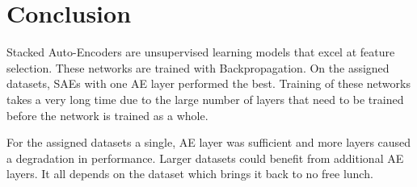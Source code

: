 \documentclass[twoside,11pt]{article}
\begin{document}
\section{Conclusion}
	Stacked Auto-Encoders are unsupervised learning models that excel at feature selection. These networks are trained with Backpropagation. On the assigned datasets, SAEs with one AE layer performed the best. Training of these networks takes a very long time due to the large number of layers that need to be trained before the network is trained as a whole. 
	
	For the assigned datasets a single, AE layer was sufficient and more layers caused a degradation in performance. Larger datasets could benefit from additional AE layers. It all depends on the dataset which brings it back to no free lunch.
\newpage


\end{document}
